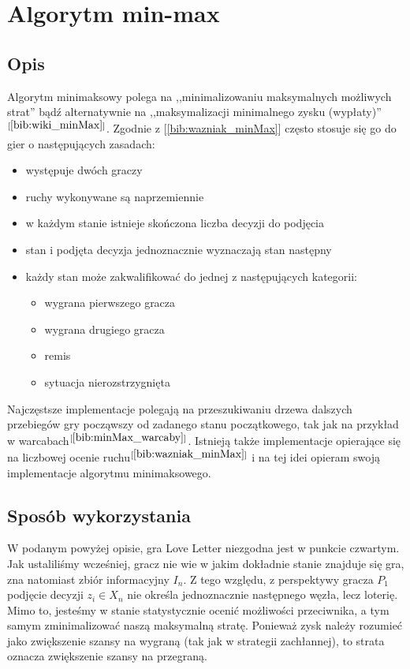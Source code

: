 \section{Algorytm min-max}
\label{sec:minmax}
\subsection{Opis}
Algorytm minimaksowy polega na ,,minimalizowaniu maksymalnych możliwych strat'' bądź alternatywnie na ,,maksymalizacji minimalnego zysku (wypłaty)''$^{[\ref{bib:wiki_minMax}]}$. Zgodnie z [\ref{bib:wazniak_minMax}] często stosuje się go do gier o następujących zasadach:
\begin{itemize}
	\item występuje dwóch graczy
	\item ruchy wykonywane są naprzemiennie
	\item w każdym stanie istnieje skończona liczba decyzji do podjęcia
	\item stan i podjęta decyzja jednoznacznie wyznaczają stan następny
	\item każdy stan może zakwalifikować do jednej z następujących kategorii:
	\begin{itemize}
		\item wygrana pierwszego gracza
		\item wygrana drugiego gracza
		\item remis
		\item sytuacja nierozstrzygnięta
	\end{itemize}
\end{itemize}
Najczęstsze implementacje polegają na przeszukiwaniu drzewa dalszych przebiegów gry począwszy od zadanego stanu początkowego, tak jak na przykład w warcabach$^{[\ref{bib:minMax_warcaby}]}$. Istnieją także implementacje opierające się na liczbowej ocenie ruchu$^{[\ref{bib:wazniak_minMax}]}$ i na tej idei opieram swoją implementacje algorytmu minimaksowego.

\subsection{Sposób wykorzystania}
W podanym powyżej opisie, gra Love Letter niezgodna jest w punkcie czwartym. Jak ustaliliśmy wcześniej, gracz nie wie w jakim dokładnie stanie znajduje się gra, zna natomiast zbiór informacyjny $I_n$. Z tego względu, z perspektywy gracza $P_1$ podjęcie decyzji $z_i \in X_n$ nie określa jednoznacznie następnego węzła, lecz loterię. Mimo to, jesteśmy w stanie statystycznie ocenić możliwości przeciwnika, a tym samym zminimalizować naszą maksymalną stratę. Ponieważ zysk należy rozumieć jako zwiększenie szansy na wygraną (tak jak w strategii zachłannej), to strata oznacza zwiększenie szansy na przegraną. 

